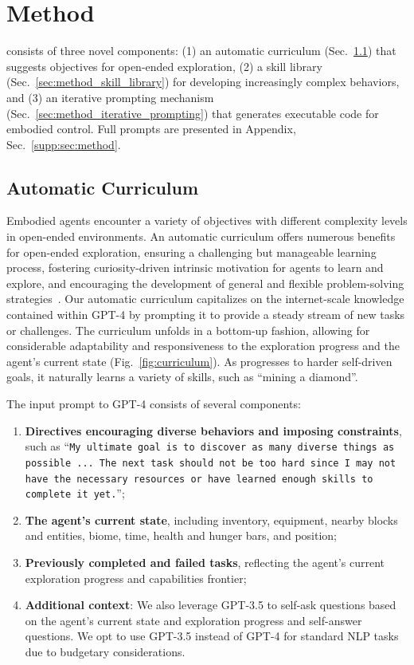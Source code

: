\section{Method}
\label{sec:method}
\voyager consists of three novel components: (1) an automatic curriculum (Sec.~\ref{sec:method_automatic_curriculum}) that suggests objectives for open-ended exploration, (2) a skill library (Sec.~\ref{sec:method_skill_library}) for developing increasingly complex behaviors, and (3) an iterative prompting mechanism (Sec.~\ref{sec:method_iterative_prompting}) that generates executable code for embodied control. Full prompts are presented in Appendix, Sec.~\ref{supp:sec:method}.
\subsection{Automatic Curriculum}
\label{sec:method_automatic_curriculum}

Embodied agents encounter a variety of objectives with different complexity levels in open-ended environments. An automatic curriculum offers numerous benefits for open-ended exploration, ensuring a challenging but manageable learning process, fostering curiosity-driven intrinsic motivation for agents to learn and explore, and encouraging the development of general and flexible problem-solving strategies~\cite{wang2019paired,portelas2020automatic,forestier2022intrinsically}. Our automatic curriculum capitalizes on the internet-scale knowledge contained within GPT-4 by prompting it to provide a steady stream of new tasks or challenges. 
The curriculum unfolds in a bottom-up fashion, allowing for considerable adaptability and responsiveness to the exploration progress and the agent's current state (Fig.~\ref{fig:curriculum}). As \voyager progresses to harder self-driven goals, it naturally learns a variety of skills, such as ``mining a diamond''.

The input prompt to GPT-4 consists of several components: 
\begin{enumerate}[label=(\arabic*)]
    \item \textbf{Directives encouraging diverse behaviors and imposing constraints}, such as ``\texttt{My ultimate goal is to discover as many diverse things as possible ... The next task should not be too hard since I may not have the necessary resources or have learned enough skills to complete it yet.}'';
    \item \textbf{The agent's current state}, including inventory, equipment, nearby blocks and entities, biome, time, health and hunger bars, and position;
    \item \textbf{Previously completed and failed tasks}, reflecting the agent's current exploration progress and capabilities frontier;
    \item \textbf{Additional context}: We also leverage GPT-3.5 to self-ask questions based on the agent's current state and exploration progress and self-answer questions. We opt to use GPT-3.5 instead of GPT-4 for standard NLP tasks due to budgetary considerations.
\end{enumerate}

